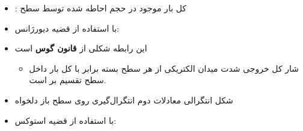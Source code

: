 \begin{ELjoin}

\begin{itemize}
\tightlist
\item
  : کل بار موجود در حجم  احاطه شده توسط سطح 
\item
  با استفاده از قضیه دیورژانس:
\end{itemize}

\begin{ELimportant}{}


\end{ELimportant}

\end{ELjoin}

\begin{ELunit}

\begin{itemize}
\tightlist
\item
  این رابطه شکلی از \textbf{قانون گوس} است

  \begin{itemize}
  \tightlist
  \item
    شار کل خروجی شدت میدان الکتریکی از هر سطح بسته برابر با کل بار داخل سطح تقسیم بر  است.
  \end{itemize}
\item
  شکل انتگرالی معادلات دوم \ELim{\ELto} انتگرال‌گیری روی سطح باز دلخواه 
\end{itemize}


\end{ELunit}

\begin{ELjoin}

\begin{itemize}
\tightlist
\item
  با استفاده از قضیه استوکس:
\end{itemize}

\begin{ELimportant}{}


\end{ELimportant}

\end{ELjoin}

